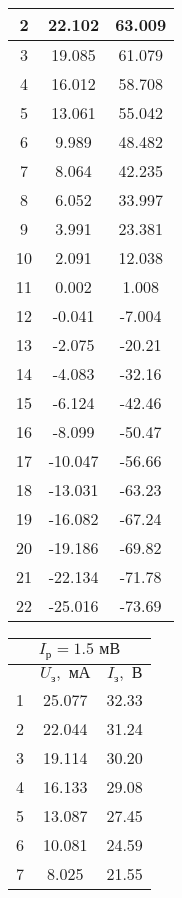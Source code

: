 \documentclass[a4paper,12pt]{article} %
\begin{document}
\begin{enumerate}
\begin{table}[h]
\begin{tabular}{|c|c|c|}
            2 & 22.102 & 63.009 \\ \hline
            3 & 19.085 & 61.079 \\ \hline
            4 & 16.012 & 58.708 \\ \hline
            5 & 13.061 & 55.042 \\ \hline
            6 & 9.989 & 48.482 \\ \hline
            7 & 8.064 & 42.235 \\ \hline
            8 & 6.052 & 33.997 \\ \hline
            9 & 3.991 & 23.381 \\ \hline
            10 & 2.091 & 12.038 \\ \hline
            11 & 0.002 & 1.008 \\ \hline
            12 & -0.041 & -7.004 \\ \hline
            13 & -2.075 & -20.21 \\ \hline
            14 & -4.083 & -32.16 \\ \hline
            15 & -6.124 & -42.46 \\ \hline
            16 & -8.099 & -50.47 \\ \hline
            17 & -10.047 & -56.66 \\ \hline
            18 & -13.031 & -63.23 \\ \hline
            19 & -16.082 & -67.24 \\ \hline
            20 & -19.186 & -69.82 \\ \hline
            21 & -22.134 & -71.78 \\ \hline
            22 & -25.016 & -73.69 \\ \hline
	\end{tabular}
        \begin{tabular}{|c|c|c|}
            \hline
            \multicolumn{3}{|c|}{$I_\text{р} = 1.5 \text{ мВ}$} \\ \hline
		\hline
		& $ U_{\text{з}}, \text{ мА}$ & $ I_{\text{з}}, \text{ В}$ \\ \hline
		1 & 25.077 & 32.33 \\ \hline
            2 & 22.044 & 31.24 \\ \hline
            3 & 19.114 & 30.20 \\ \hline
            4 & 16.133 & 29.08 \\ \hline
            5 & 13.087 & 27.45 \\ \hline
            6 & 10.081 & 24.59 \\ \hline
            7 & 8.025 & 21.55 \\ \hline

\end{tabular}
\end{table}
\end{enumerate}
\end{document}
